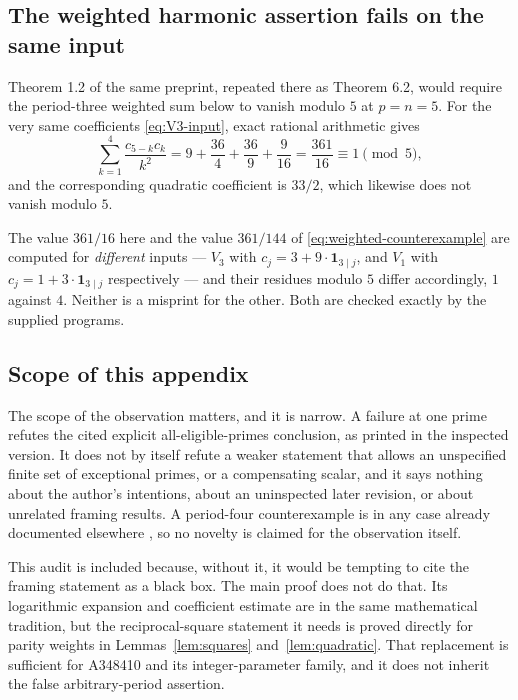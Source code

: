\documentclass[11pt,a4paper]{article}
\numberwithin{equation}{section}
\theoremstyle{definition}
\theoremstyle{remark}
\begin{document}
\subsection{The weighted harmonic assertion fails on the same input}
Theorem 1.2 of the same preprint, repeated there as Theorem 6.2, would
require the period-three weighted sum below to vanish modulo $5$ at
$p=n=5$. For the very same coefficients \eqref{eq:V3-input}, exact rational
arithmetic gives
\begin{equation}\label{eq:audit-harmonic}
 \sum_{k=1}^{4}\frac{c_{5-k}c_k}{k^2}
 =9+\frac{36}{4}+\frac{36}{9}+\frac9{16}
 =\frac{361}{16}\equiv1\pmod5,
\end{equation}
and the corresponding quadratic coefficient is $33/2$, which likewise does
not vanish modulo $5$.

The value $361/16$ here and the value $361/144$ of
\eqref{eq:weighted-counterexample} are computed for \emph{different} inputs
--- $V_3$ with $c_j=3+9\cdot\mathbf1_{3\mid j}$, and $V_1$ with
$c_j=1+3\cdot\mathbf1_{3\mid j}$ respectively --- and their residues modulo
$5$ differ accordingly, $1$ against $4$. Neither is a misprint for the other.
Both are checked exactly by the supplied programs.

\subsection{Scope of this appendix}
The scope of the observation matters, and it is narrow. A failure at one
prime refutes the cited explicit all-eligible-primes conclusion, as printed
in the inspected version. It does not by itself refute a weaker statement
that allows an unspecified finite set of exceptional primes, or a
compensating scalar, and it says nothing about the author's intentions, about
an uninspected later revision, or about unrelated framing results. A
period-four counterexample is in any case already documented elsewhere
\cite{priorcounter}, so no novelty is claimed for the observation itself.

This audit is included because, without it, it would be tempting to cite the
framing statement as a black box. The main proof does not do that. Its
logarithmic expansion and coefficient estimate are in the same mathematical
tradition, but the reciprocal-square statement it needs is proved directly
for parity weights in Lemmas~\ref{lem:squares} and~\ref{lem:quadratic}. That
replacement is sufficient for A348410 and its integer-parameter family, and
it does not inherit the false arbitrary-period assertion.
\end{document}
